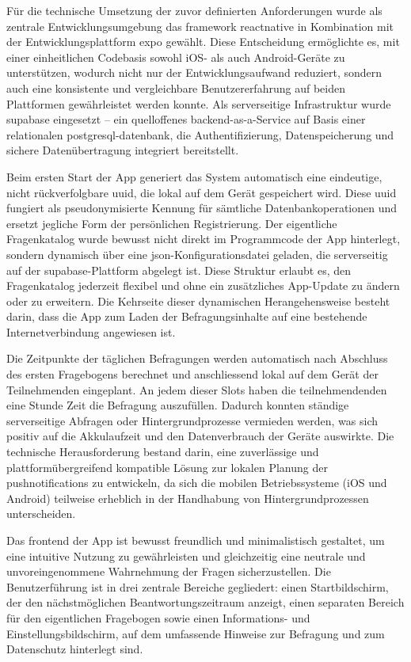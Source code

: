 Für die technische Umsetzung der zuvor definierten Anforderungen wurde als zentrale Entwicklungsumgebung das \gls{framework} \gls{reactnative} in Kombination mit der Entwicklungsplattform \gls{expo} gewählt. Diese Entscheidung ermöglichte es, mit einer einheitlichen Codebasis sowohl iOS- als auch Android-Geräte zu unterstützen, wodurch nicht nur der Entwicklungsaufwand reduziert, sondern auch eine konsistente und vergleichbare Benutzererfahrung auf beiden Plattformen gewährleistet werden konnte. Als serverseitige Infrastruktur wurde \gls{supabase} eingesetzt – ein quelloffenes \gls{backend}-as-a-Service auf Basis einer relationalen \gls{postgresql}-\gls{datenbank}, die Authentifizierung, Datenspeicherung und sichere Datenübertragung integriert bereitstellt.

Beim ersten Start der App generiert das System automatisch eine eindeutige, nicht rückverfolgbare \gls{uuid}, die lokal auf dem Gerät gespeichert wird. Diese \gls{uuid} fungiert als pseudonymisierte Kennung für sämtliche Datenbankoperationen und ersetzt jegliche Form der persönlichen Registrierung. Der eigentliche Fragenkatalog wurde bewusst nicht direkt im Programmcode der App hinterlegt, sondern dynamisch über eine \gls{json}-Konfigurationsdatei geladen, die serverseitig auf der \gls{supabase}-Plattform abgelegt ist. Diese Struktur erlaubt es, den Fragenkatalog jederzeit flexibel und ohne ein zusätzliches App-Update zu ändern oder zu erweitern. Die Kehrseite dieser dynamischen Herangehensweise besteht darin, dass die App zum Laden der Befragungsinhalte auf eine bestehende Internetverbindung angewiesen ist.

Die Zeitpunkte der täglichen Befragungen werden automatisch nach Abschluss des ersten Fragebogens berechnet und anschliessend lokal auf dem Gerät der Teilnehmenden eingeplant. An jedem dieser Slots haben die teilnehmendenden eine Stunde Zeit die Befragung auszufüllen. Dadurch konnten ständige serverseitige Abfragen oder Hintergrundprozesse vermieden werden, was sich positiv auf die Akkulaufzeit und den Datenverbrauch der Geräte auswirkte. Die technische Herausforderung bestand darin, eine zuverlässige und plattformübergreifend kompatible Lösung zur lokalen Planung der \glspl{pushnotification} zu entwickeln, da sich die mobilen Betriebssysteme (iOS und Android) teilweise erheblich in der Handhabung von Hintergrundprozessen unterscheiden.

Das \gls{frontend} der App ist bewusst freundlich und minimalistisch gestaltet, um eine intuitive Nutzung zu gewährleisten und gleichzeitig eine neutrale und unvoreingenommene Wahrnehmung der Fragen sicherzustellen. Die Benutzerführung ist in drei zentrale Bereiche gegliedert: einen Startbildschirm, der den nächstmöglichen Beantwortungszeitraum anzeigt, einen separaten Bereich für den eigentlichen Fragebogen sowie einen Informations- und Einstellungsbildschirm, auf dem umfassende Hinweise zur Befragung und zum Datenschutz hinterlegt sind.

